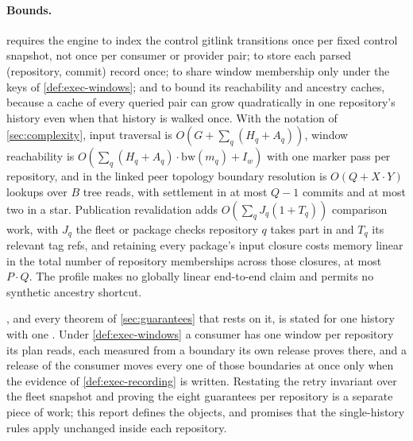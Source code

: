 \paragraph{Bounds.}
 requires the engine to index the control gitlink transitions
once per fixed control snapshot, not once per consumer or provider pair; to
store each parsed (repository, commit) record once; to share window
membership only under the keys of \cref{def:exec-windows}; and to bound its
reachability and ancestry caches, because a cache of every queried pair can
grow quadratically in one repository's history even when that history is
walked once. With the notation of \cref{sec:complexity}, input traversal is
$O(G + \sum_q (H_q + A_q))$, window reachability is $O(\sum_q (H_q + A_q)\cdot
\mathrm{bw}(m_q) + I_w)$ with one marker pass per repository, and in the linked
peer topology boundary resolution is $O(Q + X \cdot Y)$ lookups over $B$ tree
reads, with settlement in at most $Q - 1$ commits and at most two in a star.
Publication revalidation adds $O(\sum_q J_q (1 + T_q))$ comparison work, with
$J_q$ the fleet or package checks repository $q$ takes part in and $T_q$ its
relevant tag refs, and retaining every package's input closure costs memory
linear in the total number of repository memberships across those closures,
at most $P \cdot Q$. The profile makes no globally linear end-to-end claim and permits
no synthetic ancestry shortcut.

\begin{remark}
\label{rem:exec-multihistory}
, and every theorem of \cref{sec:guarantees} that rests on
it, is stated for one history with one \Head{}. Under \cref{def:exec-windows}
a consumer has one window per repository its plan reads, each measured from a
boundary its own release proves there, and a release of the consumer moves
every one of those boundaries at once only when the evidence of
\cref{def:exec-recording} is written. Restating the retry invariant over the
fleet snapshot and proving the eight guarantees per repository is a separate
piece of work; this report defines the objects, and  promises that
the single-history rules apply unchanged inside each repository.
\end{remark}
